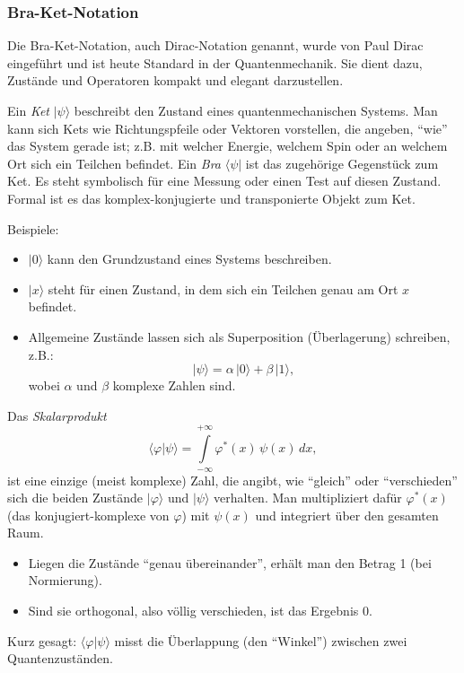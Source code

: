 \subsubsection{Bra-Ket-Notation\label{fourier:subsubsection:braKetNotation}} %
Die Bra-Ket-Notation, auch Dirac-Notation genannt, wurde von Paul Dirac eingeführt und ist heute Standard in der Quantenmechanik.
Sie dient dazu, Zustände und Operatoren kompakt und elegant darzustellen.

Ein \emph{Ket} $|\psi\rangle$ beschreibt den Zustand eines quantenmechanischen Systems.
Man kann sich Kets wie Richtungspfeile oder Vektoren vorstellen, die angeben, ``wie'' das System gerade ist;
z.B. mit welcher Energie, welchem Spin oder an welchem Ort sich ein Teilchen befindet.
Ein \emph{Bra} $\langle\psi|$ ist das zugehörige Gegenstück zum Ket.
Es steht symbolisch für eine Messung oder einen Test auf diesen Zustand.
Formal ist es das komplex-konjugierte und transponierte Objekt zum Ket.

Beispiele:
\begin{itemize}
  \item $|0\rangle$ kann den Grundzustand eines Systems beschreiben.
  \item $|x\rangle$ steht für einen Zustand, in dem sich ein Teilchen genau am Ort $x$ befindet.
  \item Allgemeine Zustände lassen sich als Superposition (Überlagerung) schreiben, z.B.:
  \[
    |\psi\rangle = \alpha\,|0\rangle + \beta\,|1\rangle,
  \]
  wobei $\alpha$ und $\beta$ komplexe Zahlen sind.
\end{itemize}

Das \emph{Skalarprodukt}
\begin{equation}
  \langle \varphi | \psi \rangle = \int\limits_{-\infty}^{+\infty} \varphi^*(x)\,\psi(x)\,dx,
\end{equation}
ist eine einzige (meist komplexe) Zahl, die angibt, wie ``gleich'' oder ``verschieden'' sich die beiden Zustände $|\varphi\rangle$ und $|\psi\rangle$ verhalten.
Man multipliziert dafür $\varphi^*(x)$ (das konjugiert-komplexe von $\varphi$) mit $\psi(x)$ und integriert über den gesamten Raum.
\begin{itemize}
	\item Liegen die Zustände ``genau übereinander'', erhält man den Betrag 1 (bei Normierung).
	\item Sind sie orthogonal, also völlig verschieden, ist das Ergebnis 0.
\end{itemize}
Kurz gesagt:
$\langle \varphi | \psi \rangle$ misst die Überlappung (den ``Winkel'') zwischen zwei Quantenzuständen.


